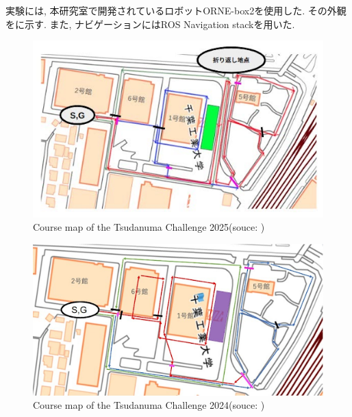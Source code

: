 実験には, 本研究室で開発されているロボットORNE-box2\cite{井口颯人2023屋外自律移動ロボットプラットフォーム-orne}を使用した. 
その外観をに示す. 
また, ナビゲーションにはROS Navigation stackを用いた. 
\begin{figure}[hbtp]
  \centering
 \includegraphics[keepaspectratio, scale=0.5]
      {images/2025tsudacha.png}
 \caption{Course map of the Tsudanuma Challenge 2025(souce: \cite{tsudachare})}
 \label{Fig:Course map of the Tsudanuma Challenge 2025}
\end{figure}
\begin{figure}[hbtp]
  \centering
 \includegraphics[keepaspectratio, scale=0.5]
      {images/2024tsudacha.png}
 \caption{Course map of the Tsudanuma Challenge 2024(souce: \cite{tsudachare})}
 \label{Fig:Course map of the Tsudanuma Challenge 2024}
\end{figure}
